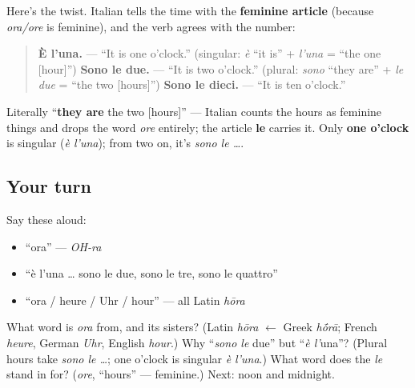 \begin{grammarlens}[title={Grammar Lens: \textquotedblleft{}è l'una\textquotedblright{} but \textquotedblleft{}sono le due\textquotedblright{}}]
Here's the twist. Italian tells the time with the \textbf{feminine article} (because \emph{ora/ore} is feminine), and the verb agrees with the number:

\begin{quote}
\textbf{È l'una.} — \textquotedblleft{}It is one o'clock.\textquotedblright{} (singular: \emph{è} \textquotedblleft{}it is\textquotedblright{} + \emph{l'una} = \textquotedblleft{}the one {[}hour{]}\textquotedblright{}) \textbf{Sono le due.} — \textquotedblleft{}It is two o'clock.\textquotedblright{} (plural: \emph{sono} \textquotedblleft{}they are\textquotedblright{} + \emph{le due} = \textquotedblleft{}the two {[}hours{]}\textquotedblright{}) \textbf{Sono le dieci.} — \textquotedblleft{}It is ten o'clock.\textquotedblright{}
\end{quote}

Literally \textquotedblleft{}\textbf{they are} the two {[}hours{]}\textquotedblright{} — Italian counts the hours as feminine things and drops the word \emph{ore} entirely; the article \textbf{le} carries it. Only \textbf{one o'clock} is singular (\emph{è l'una}); from two on, it's \emph{sono le …}.
\end{grammarlens}

\subsection*{Your turn}
Say these aloud:

\begin{itemize}
\raggedright
  \item \textquotedblleft{}ora\textquotedblright{} — \emph{OH-ra}
  \item \textquotedblleft{}è l'una … sono le due, sono le tre, sono le quattro\textquotedblright{}
  \item \textquotedblleft{}ora / heure / Uhr / hour\textquotedblright{} — all Latin \emph{hōra}
\end{itemize}

\begin{tcolorbox}[breakable,colback=teal!4,colframe=teal!35!black,title={Before you move on}]
What word is \emph{ora} from, and its sisters? (Latin \emph{hōra} $\leftarrow$ Greek \emph{h\'{\={o}}rā}; French \emph{heure}, German \emph{Uhr}, English \emph{hour}.) Why \textquotedblleft{}\emph{sono le} due\textquotedblright{} but \textquotedblleft{}\emph{è l'}una\textquotedblright{}? (Plural hours take \emph{sono le …}; one o'clock is singular \emph{è l'una}.) What word does the \emph{le} stand in for? (\emph{ore}, \textquotedblleft{}hours\textquotedblright{} — feminine.) Next: noon and midnight.
\end{tcolorbox}

